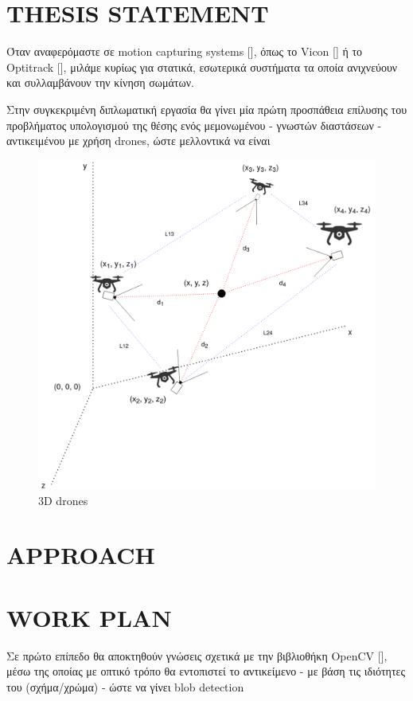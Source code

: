 \section{THESIS STATEMENT}
Όταν αναφερόμαστε σε motion capturing systems [\cite{7}], όπως το Vicon [\cite{8}] 
ή το Optitrack [\cite{9}], μιλάμε κυρίως για στατικά, εσωτερικά συστήματα τα οποία 
ανιχνεύουν και συλλαμβάνουν την κίνηση σωμάτων.

Στην συγκεκριμένη διπλωματική εργασία θα γίνει μία πρώτη προ\-σπά\-θεια επίλυσης του 
προβλήματος υπολογισμού της θέσης ενός μεμονωμένου - γνωστών διαστάσεων - αντικειμένου 
με χρήση drones, ώστε μελλοντικά να είναι 

\begin{figure}[thpb]
  \centering
  \includegraphics[width=\linewidth]{Images/3dDrones-camera-pose.png}
  \caption{3D drones}
  \label{fig:1}
\end{figure}

\section{APPROACH}


\section{WORK PLAN}
Σε πρώτο επίπεδο θα αποκτηθούν γνώσεις σχετικά με την βιβλιοθήκη OpenCV [], μέσω της οποίας
με οπτικό τρόπο θα εντοπιστεί το αντικείμενο - με βάση τις ιδιότητες του (σχήμα/χρώμα) - ώστε 
να γίνει blob detection

